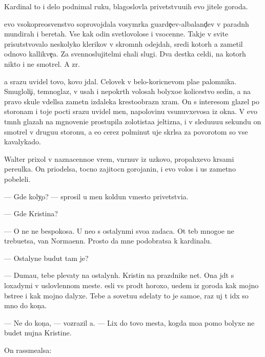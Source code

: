 \documentclass[10pt]{book}
\begin{document}
Kardinal to i delo podnimal ruku, blagoslovl{\ia}{\y}a privetstvu{\y}u{\x}ih {\y}evo jitele{\y} go\-ro\-da.

{\Y}evo v{\yi}sokopreosv{\ia}{\x}enstvo soprovojdala vosym{\e}rka guarde{\y}{\c}ev-albaland{\c}ev v paradn{\yi}h mundirah i beretah. Vse kak odin svetlovolos{\yi}{\y}e i v{\yi}socenn{\yi}{\y}e. Takje v svite prisutstvovalo neskolyko klerikov v skromn{\yi}h odejdah, sredi kotor{\yi}h {\y}a zametil odnovo kallikve{\c}a. Za sv{\ia}{\x}ennoslujitel{\ia}mi {\y}ehali slugi. Dva des{\ia}tka cel{\ia}di, na kotor{\yi}h nikto i ne smotrel. A zr{\ia}.

{\Y}a srazu uvidel tovo, kovo jdal. Celovek v belo-koricnevom pla{\x}e palomnika. Smugloli{\c}i{\y}, temnoglaz{\yi}{\y}, v usah i nepokr{\yi}t{\yi}h volosah bolyxo{\y}e kolicestvo sedin{\yi}, a na pravo{\y} skule v{\yi}del{\ia}lsa zametn{\yi}{\y} izdaleka krestoobrazn{\yi}{\y} xram. On s interesom glazel po storonam i toje pocti srazu uvidel men{\ia}, napolovinu v{\yi}sunuvxevosa iz okna. V {\y}evo t{\e}mn{\yi}h glazah na mgnoveni{\y}e prostupila zolotista{\y}a jeltizna, i v sledu{\y}u{\x}u{\y}u sekundu on smotrel v drugu{\y}u storonu, a {\y}e{\x}o cerez polminut{\yi} uje skr{\yi}lsa za povorotom so vse{\y} kavalykado{\y}.



Walter prixol v naznacenno{\y}e vrem{\ia}, v{\yi}n{\yi}rnuv iz uzkovo, propahxevo kr{\yi}sami pereulka. On priodelsa, tocno zajitocn{\yi}{\y} gorojanin, i {\y}evo volos{\yi} i us{\yi} zametno pobeleli.

— Gde koly{\c}o? — sprosil u men{\ia} koldun vmesto privetstvi{\y}a.

— Gde Kristina?

— O ne{\y} ne bespoko{\y}sa. U ne{\y}o s ostalyn{\yi}mi svo{\y}a zadaca. Ot teb{\ia} mnogo{\y}e ne trebu{\y}etsa, van Normaenn. Prosto da{\y} mne podobratsa k kardinalu.

— Ostalyn{\yi}{\y}e budut tam je?

— Duma{\y}u, tebe plevaty na ostalyn{\yi}h. Kristin{\yi} na prazdnike net. Ona jd{\e}t s lo\-xady\-mi v uslovlennom meste. {\Y}esli vs{\e} pro{\y}d{\e}t horoxo, u{\y}edem iz go\-ro\-da kak mojno b{\yi}stre{\y}e i kak mojno dalyxe. Tebe {\y}a sovetu{\y}u sdelaty to je samo{\y}e, raz uj t{\yi} id{\e}x so mno{\y} do kon{\c}a.

— Ne do kon{\c}a, — vozrazil {\y}a. — Lix do tovo mesta, kogda mo{\y}a pomo{\x} bolyxe ne budet nujna Kristine.

On rassme{\y}alsa:
\end{document}
